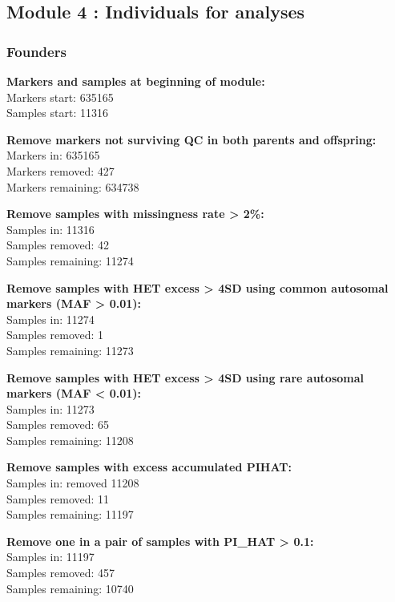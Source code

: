 \documentclass[]{article}
\begin{document}
\subsection{Module 4 : Individuals for
analyses}\label{module-4-individuals-for-analyses}

\subsubsection{Founders}\label{founders-1}

\textbf{Markers and samples at beginning of module:}\\
Markers start: 635165\\
Samples start: 11316

\textbf{Remove markers not surviving QC in both parents and
offspring:}\\
Markers in: 635165\\
Markers removed: 427\\
Markers remaining: 634738

\textbf{Remove samples with missingness rate \textgreater{} 2\%:}\\
Samples in: 11316\\
Samples removed: 42\\
Samples remaining: 11274

\textbf{Remove samples with HET excess \textgreater{} 4SD using common
autosomal markers (MAF \textgreater{} 0.01):}\\
Samples in: 11274\\
Samples removed: 1\\
Samples remaining: 11273

\textbf{Remove samples with HET excess \textgreater{} 4SD using rare
autosomal markers (MAF \textless{} 0.01):}\\
Samples in: 11273\\
Samples removed: 65\\
Samples remaining: 11208

\textbf{Remove samples with excess accumulated PIHAT:}\\
Samples in: removed 11208\\
Samples removed: 11\\
Samples remaining: 11197

\textbf{Remove one in a pair of samples with PI\_HAT \textgreater{}
0.1:}\\
Samples in: 11197\\
Samples removed: 457\\
Samples remaining: 10740
\end{document}
